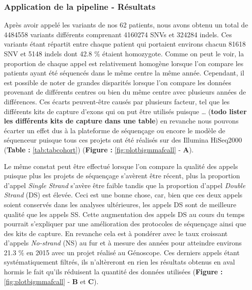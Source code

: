 \documentclass[12pt,twoside]{reedthesis}
\theoremstyle{definition}
\theoremstyle{definition}
\theoremstyle{remark}
\begin{document}
  \newpage
  
  \subsubsection{Application de la pipeline -
  Résultats}\label{application-de-la-pipeline---resultats}
  
  Après avoir appelé les variants de nos 62 patients, nous avons obtenu un
  total de 4484558 variants différents comprenant 4160274 SNVs et 324284
  indels. Ces variants étant répartit entre chaque patient qui portaient
  environs chacun 81618 SNV et 5148 indels dont 42.8 \% étaient
  homozygote. Comme on peut le voir, la proportion de chaque appel est
  relativement homogène lorsque l'on compare les patients ayant été
  séquencés dans le même centre la même année. Cependant, il est possible
  de noter de grandes disparités lorsque l'on compare les données
  provenant de différents centres ou bien du même centre avec plusieurs
  années de différences. Ces écarts peuvent-être causés par plusieurs
  facteur, tel que les différents kits de capture d'exons qui on put être
  utilisés puisque \ldots{} (\textbf{todo lister les différents kits de
  capture dans une table}) en revanche nous pouvons écarter un effet dus à
  la plateforme de séquençage ou encore le modèle de séquenceur puisque
  tous ces projets ont été réalisés sur des Illumina HiSeq2000
  (\textbf{Table : }\ref{tab:tabcohort}) (\textbf{Figure :
  }\ref{fig:plotbigmmafcall} - \textbf{A}).
  
  Le même constat peut être effectué lorsque l'on compare la qualité des
  appels puisque plus les projets de séquençage s'avèrent être récent,
  plus la proportion d'appel \emph{Single Strand} s'avère être faible
  tandis que la proportion d'appel \emph{Double Strand} (DS) est élevée.
  Ceci est une bonne chose, car, bien que ces deux appels soient conservés
  dans les analyses ultérieures, les appels DS sont de meilleure qualité
  que les appels SS. Cette augmentation des appels DS au cours du temps
  pourrait s'expliquer par une amélioration des protocoles de séquençage
  ainsi que des kits de capture. En revanche cela est à pondérer avec le
  taux croissant d'appels \emph{No-strand} (NS) au fur et à mesure des
  années pour atteindre environs 21.3 \% en 2015 avec un projet réalisé au
  Génoscope. Ces derniers appels étant systématiquement filtrés, ils
  n'altèreront en rien les résultats obtenus en aval hormis le fait qu'ils
  réduisent la quantité des données utilisées (\textbf{Figure :
  }\ref{fig:plotbigmmafcall} - \textbf{B} et \textbf{C}).
  
\end{document}
